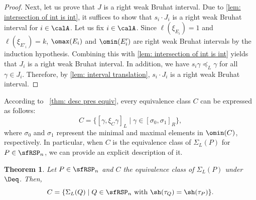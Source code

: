 \documentclass[12pt, reqno]{amsart}
\newtheorem{theorem}{Theorem}[section]
\theoremstyle{definition}
\numberwithin{equation}{section} \numberwithin{figure}{section}
\numberwithin{table}{section}
\begin{document}
\begin{proof}
Next, let us prove that $J$ is a right weak Bruhat interval.
Due to \cref{lem: intersection of int is int}, it suffices to show that $s_i \cdot J_i$ is a right weak Bruhat interval for $i \in \calA$.
Let us fix $i \in \calA$.
Since $\ell(\xi_{E_i}) = 1$ and $\ell(\xi_{E'_i}) = k$, $\omax(E_i)$ and $\omin(E'_i)$ are right weak Bruhat intervals by the induction hypothesis.
Combining this with \cref{lem: intersection of int is int} yields that $J_i$ is a right weak Bruhat interval.
In addition, we have $s_i \gamma \preceq_L \gamma$ for all $\gamma \in J_i$.
Therefore, by \cref{lem: interval translation}, $s_i \cdot J_i$ is a right weak Bruhat interval.
\end{proof}







According to ~\cref{thm: desc pres equiv}, every  equivalence class $C$ can be expressed as follows:
\[
C = \{[\gamma,  \xi_C\gamma]_L \mid \gamma \in [\sigma_0, \sigma_1]_R\},
\]
where $\sigma_0$ and $\sigma_1$ represent the minimal and maximal elements in $\omin(C)$, respectively.
In particular,
when $C$ is the equivalence class of $\Sigma_L(P)$ for $P \in \sfRSP_n$,
we can provide an explicit description of it.




  





\begin{theorem}\label{thm: equiv class X lam mu}
Let $P \in \sfRSP_n$ and $C$ the equivalence class of $\Sigma_L(P)$ under $\Deq$.
Then, 
\[
C = \{\Sigma_L(Q) \mid \text{$Q \in \sfRSP_n$ with $\sh(\tau_Q) = \sh(\tau_P)$} \}.
\]
\end{theorem}
\end{document}
